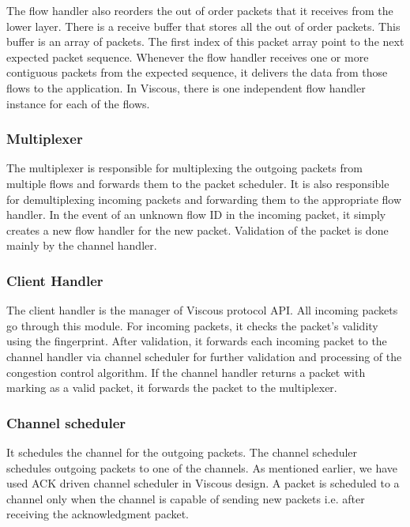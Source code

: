 The flow handler also reorders the out of order packets that  it receives from the lower layer. There is a receive buffer that stores all the out of order packets. This buffer is an array of packets. The first index of this packet array point to the next expected packet sequence. Whenever the flow handler receives one or more contiguous packets from the expected sequence, it delivers the data from those flows to the application. In Viscous, there is one independent flow handler instance for each of the flows.

\subsubsection{Multiplexer}
The multiplexer is responsible for multiplexing the outgoing packets from multiple flows and forwards them to the packet scheduler. It is also responsible for demultiplexing incoming packets and forwarding them to the appropriate flow handler. In the event of an unknown flow ID in the incoming packet, it simply creates a new flow handler for the new packet. Validation of the packet is done mainly by the channel handler.

\subsubsection{Client Handler}
The client handler is the manager of Viscous protocol API. All incoming packets go through this module. For incoming packets, it checks the packet's validity using the fingerprint.  After validation, it forwards each incoming packet to the channel handler via channel scheduler for further validation and processing of the congestion control algorithm. If the channel handler returns a packet with marking as a valid packet, it forwards the packet to the multiplexer.

\subsubsection{Channel scheduler}
It schedules the channel for the outgoing packets. The channel scheduler schedules outgoing packets to one of the channels. As mentioned earlier, we have used ACK driven channel scheduler in Viscous design. A packet is scheduled to a channel only when the channel is capable of sending new packets i.e. after receiving the acknowledgment packet. %


